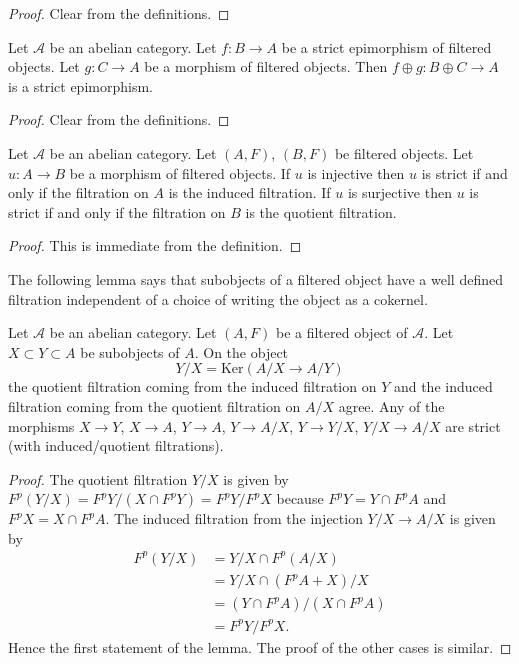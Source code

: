\begin{proof}
Clear from the definitions.
\end{proof}

\begin{lemma}
\label{lemma-add-summand-strict-epimorphism}
Let $\mathcal{A}$ be an abelian category.
Let $f : B \to A$ be a strict epimorphism of filtered objects.
Let $g : C \to A$ be a morphism of filtered objects.
Then $f \oplus g : B \oplus C \to A$ is a strict epimorphism.
\end{lemma}

\begin{proof}
Clear from the definitions.
\end{proof}

\begin{lemma}
\label{lemma-induced-and-quotient-strict}
Let $\mathcal{A}$ be an abelian category.
Let $(A, F)$, $(B, F)$ be filtered objects.
Let $u : A \to B$ be a morphism of filtered objects.
If $u$ is injective then $u$ is strict if and only if the filtration
on $A$ is the induced filtration.
If $u$ is surjective then $u$ is strict if and only if the filtration
on $B$ is the quotient filtration.
\end{lemma}

\begin{proof}
This is immediate from the definition.
\end{proof}

\noindent
The following lemma says that subobjects of a filtered object have a well
defined filtration independent of a choice of writing the object as a
cokernel.

\begin{lemma}
\label{lemma-filtration-subobject}
Let $\mathcal{A}$ be an abelian category.
Let $(A, F)$ be a filtered object of $\mathcal{A}$.
Let $X \subset Y \subset A$ be subobjects of $A$.
On the object
$$
Y/X = \text{Ker}(A/X \to A/Y)
$$
the quotient filtration coming from the induced filtration on $Y$ and the
induced filtration coming from the quotient filtration on $A/X$ agree.
Any of the morphisms $X \to Y$, $X \to A$, $Y \to A$, $Y \to A/X$,
$Y \to Y/X$, $Y/X \to A/X$ are strict (with induced/quotient filtrations).
\end{lemma}

\begin{proof}
The quotient filtration $Y/X$ is given by
$F^p(Y/X) = F^pY/(X \cap F^pY) = F^pY/F^pX$
because $F^pY = Y \cap F^pA$ and $F^pX = X \cap F^pA$.
The induced filtration from the injection $Y/X \to A/X$ is given by
\begin{align*}
F^p(Y/X) & = Y/X \cap F^p(A/X) \\
& = Y/X \cap (F^pA + X)/X \\
& = (Y \cap F^pA)/(X \cap F^pA) \\
& = F^pY/F^pX.
\end{align*}
Hence the first statement of the lemma.
The proof of the other cases is similar.
\end{proof}

